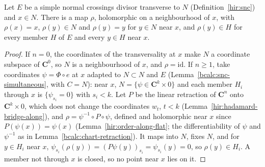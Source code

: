 \begin{lemma}
\label{bcalc:member-retraction}
\leanok
Let \(E\) be a simple normal crossings divisor transverse to \(N\) (Definition~\ref{hir:snc}) and \(x\in N\). There is a map \(\rho\), holomorphic on a
neighbourhood of \(x\), with \(\rho(x)=x\), \(\rho(y)\in N\) and \(\rho(y)=y\) for \(y\in N\) near \(x\), and \(\rho(y)\in H\) for every member \(H\) of \(E\) and
every \(y\in H\) near \(x\).
\end{lemma}
\begin{proof}
\leanok
If \(n=0\), the coordinates of the transversality at \(x\) make \(N\) a coordinate subspace of \(\mathbf C^0\), so \(N\) is a neighbourhood of \(x\), and
\(\rho=\mathrm{id}\). If \(n\ge1\), take coordinates \(\psi=\Phi\circ e\) at \(x\) adapted to \(N\subset N\) and \(E\) (Lemma~\ref{bcalc:snc-simultaneous}, with \(C=N\)):
near \(x\), \(N=\{\psi\in\mathbf C^{k}\times0\}\) and each member \(H_i\) through \(x\) is \(\{\psi_{s_i}=0\}\) with \(s_i<k\). Let \(P\) be the linear retraction
of \(\mathbf C^n\) onto \(\mathbf C^k\times0\), which does not change the coordinates \(w_t\), \(t<k\) (Lemma~\ref{hir:hadamard-bridge-along}), and
\(\rho=\psi^{-1}\circ P\circ\psi\), defined and holomorphic near \(x\) since \(P(\psi(x))=\psi(x)\) (Lemma~\ref{hir:order-along-flat}; the differentiability
of \(\psi\) and \(\psi^{-1}\) as in Lemma~\ref{bcalc:chart-retraction}). It maps into \(N\), fixes \(N\), and for \(y\in H_i\) near \(x\),
\(\psi_{s_i}(\rho(y))=(P\psi(y))_{s_i}=\psi_{s_i}(y)=0\), so \(\rho(y)\in H_i\). A member not through \(x\) is closed, so no point near \(x\) lies on it.
\end{proof}

